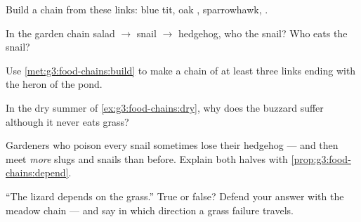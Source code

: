 \begin{exercise}[$\star$]\label{exo:g3:food-chains:5}
Build a chain from these links: blue tit, oak ,
sparrowhawk, .
\end{exercise}

\begin{exercise}[$\star$]\label{exo:g3:food-chains:6}
In the garden chain salad $\rightarrow$ snail $\rightarrow$
hedgehog, who  the snail? Who eats the snail?
\end{exercise}

\begin{exercise}[$\star$]\label{exo:g3:food-chains:7}
Use \cref{met:g3:food-chains:build} to make a chain of at least
three links ending with the heron of the pond.
\end{exercise}

\begin{exercise}[$\star$]\label{exo:g3:food-chains:8}
In the dry summer of \cref{ex:g3:food-chains:dry}, why does the
buzzard suffer although it never eats grass?
\end{exercise}

\begin{exercise}[$\star\star$]\label{exo:g3:food-chains:9}
Gardeners who poison every snail sometimes lose their hedgehog
--- and then meet \emph{more} slugs and snails than before.
Explain both halves with
\cref{prop:g3:food-chains:depend}.
\end{exercise}

\begin{exercise}[$\star\star$]\label{exo:g3:food-chains:10}
``The lizard depends on the grass.'' True or false? Defend your
answer with the meadow chain --- and say in which direction a
grass failure travels.
\end{exercise}
